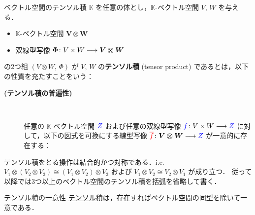 \documentclass[rep_main]{subfiles}
\begin{document}
\begin{mydef}[label=def:univ-vec-tensor]{ベクトル空間のテンソル積}
    $\mathbb{K}$ を任意の体とし，$\mathbb{K}$-ベクトル空間 $V,\, W$ を与える．
    \begin{itemize}
        \item $\mathbb{K}$-ベクトル空間 $\bm{V \otimes W}$ 
        \item 双線型写像 $\bm{\Phi} \colon V \times W \longrightarrow \bm{V \otimes W}$ 
    \end{itemize}
    の2つ組 $(V \otimes W,\, \Phi)$ が $V,\, W$ の\textbf{テンソル積} (tensor product) であるとは，以下の性質を充たすことをいう：
    \begin{description}
        \item[\textbf{(テンソル積の普遍性)}]　
        
        任意の $\mathbb{K}$-ベクトル空間 $\textcolor{blue}{Z}$ および任意の双線型写像 $\textcolor{blue}{f} \colon V \times W \longrightarrow \textcolor{blue}{Z}$ に対して，以下の図式を可換にする線型写像 $\textcolor{red}{\overline{f}} \colon \bm{V \otimes W} \longrightarrow \textcolor{blue}{Z}$ が一意的に存在する：
        \begin{center}
        \end{center}
    \end{description}
\end{mydef}

テンソル積をとる操作は結合的かつ対称である．i.e. $V_1 \otimes (V_2 \otimes V_3) \cong (V_1 \otimes V_2) \otimes V_3$ および $V_1 \otimes V_2 \cong V_2 \otimes V_1$ が成り立つ．
従って以降では3つ以上のベクトル空間のテンソル積を括弧を省略して書く．

\begin{myprop}[label=prop:unique-tensor-vec]{テンソル積の一意性}
	\hyperref[def:univ-vec-tensor]{テンソル積}は，存在すればベクトル空間の同型を除いて一意である．
\end{myprop}
\end{document}

